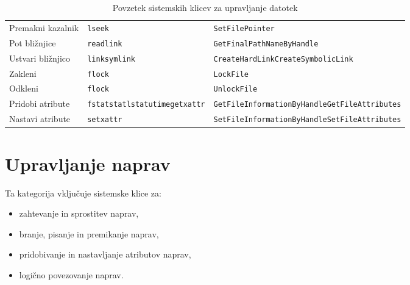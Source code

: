 \documentclass[a4paper,12pt,openright]{book}
\begin{document}
\begin{table}[h!]
\begin{center}
\begin{tabular}{ p{3.7cm}|p{2.5cm}|p{6cm} }
			Premakni kazalnik  & \verb|lseek|                                                                                   & \verb|SetFilePointer|                                             \\
			Pot bližnjice     & \verb|readlink|                                                                                & \verb|GetFinalPathNameByHandle|                                   \\
			Ustvari bližnjico & \verb|link|\newline\verb|symlink|                                                              & \verb|CreateHardLink|\newline\verb|CreateSymbolicLink|            \\
			Zakleni            & \verb|flock|                                                                                   & \verb|LockFile|                                                   \\
			Odkleni            & \verb|flock|                                                                                   & \verb|UnlockFile|                                                 \\
			Pridobi atribute   & \verb|fstat|\newline\verb|stat|\newline\verb|lstat|\newline\verb|utime|\newline\verb|getxattr| & \verb|GetFileInformationByHandle|\newline\verb|GetFileAttributes| \\
			Nastavi atribute   & \verb|setxattr|                                                                                & \verb|SetFileInformationByHandle|\newline\verb|SetFileAttributes| \\
		\end{tabular}
	\end{center}
	\label{tab:file_management}
	\caption{Povzetek sistemskih klicev za upravljanje datotek}
\end{table}

\section{Upravljanje naprav}

Ta kategorija vključuje sistemske klice za:
\begin{itemize}
	\item zahtevanje in sprostitev naprav,
	\item branje, pisanje in premikanje naprav,
	\item pridobivanje in nastavljanje atributov naprav,
	\item logično povezovanje naprav. \cite{Silberschatz_Galvin_Gagne_2018}
\end{itemize}
\end{document}
